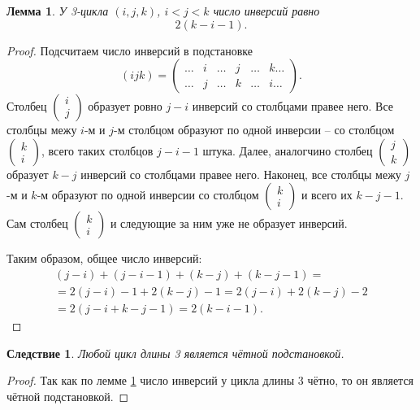 \documentclass{article}
\newtheorem{corollary}{Следствие}[section]
\newtheorem{lemma}{Лемма}[section]
\begin{document}
\begin{lemma} \label{qftt}
    У 3-цикла $(i,j,k)$, $i < j< k$ число инверсий равно $$ 2(k - i - 1). $$
\end{lemma}
\begin{proof}
    Подсчитаем число инверсий в подстановке
    \[
        (ijk) = 
        \begin{pmatrix}
            \dots & i & \dots & j & \dots & k \dots \\
            \dots & j & \dots & k & \dots & i \dots
        \end{pmatrix}.
    \]
    Столбец $\begin{pmatrix} i \\ j \end{pmatrix}$ образует ровно $j - i$ инверсий со столбцами правее него. Все столбцы межу $i$-м и $j$-м столбцом образуют по одной инверсии -- со столбцом $\begin{pmatrix} k \\ i \end{pmatrix}$, всего таких столбцов $j - i -1$ штука.
    Далее, аналогчино столбец $\begin{pmatrix} j \\ k \end{pmatrix}$ образует $k - j$ инверсий со столбцами правее него. Наконец, все столбцы межу $j$-м и $k$-м образуют по одной инверсии со столбцом $\begin{pmatrix} k \\ i \end{pmatrix}$ и всего их $k - j - 1$. Сам столбец $\begin{pmatrix} k \\ i \end{pmatrix}$ и следующие за ним уже не образует инверсий.

    Таким образом, общее число инверсий:
    \begin{multline*}
        (j - i) + (j - i - 1) + (k - j) + (k - j - 1) = \\
        = 2(j - i) - 1 + 2(k - j) - 1 = 2(j - i) + 2 (k - j) - 2 \\
        = 2(j - i + k - j - 1) = 2(k - i - 1).
    \end{multline*}
\end{proof}

\begin{corollary} \label{nwevbuop}
    Любой цикл длины 3 является чётной подстановкой.
\end{corollary}
\begin{proof}
    Так как по лемме \ref{qftt} число инверсий у цикла длины 3 чётно, то он является чётной подстановкой.
\end{proof}
\end{document}
